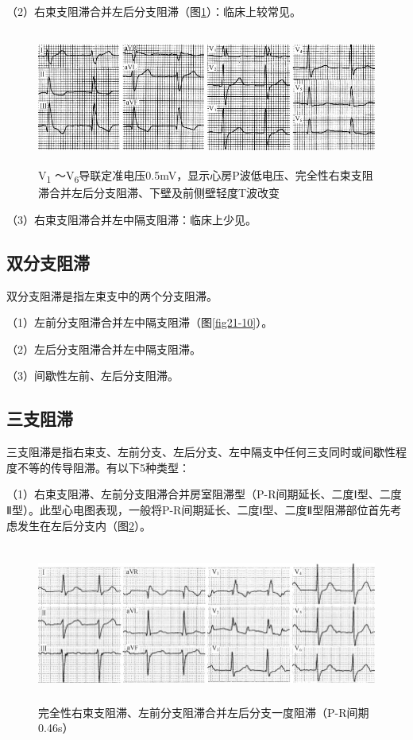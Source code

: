 （2）右束支阻滞合并左后分支阻滞（图\ref{fig21-14}）：临床上较常见。

\begin{figure}[!htbp]
 \centering
 \includegraphics[width=5.58333in,height=1.75in]{./images/Image00362.jpg}
 \captionsetup{justification=centering}
 \caption{V\textsubscript{1} ～V\textsubscript{6}导联定准电压0.5mV，显示心房P波低电压、完全性右束支阻滞合并左后分支阻滞、下壁及前侧壁轻度T波改变}
 \label{fig21-14}
  \end{figure} 


（3）右束支阻滞合并左中隔支阻滞：临床上少见。

\protect\hypertarget{text00028.htmlux5cux23subid352}{}{}

\subsection{双分支阻滞}

双分支阻滞是指左束支中的两个分支阻滞。

（1）左前分支阻滞合并左中隔支阻滞（图\ref{fig21-10}）。

（2）左后分支阻滞合并左中隔支阻滞。

（3）间歇性左前、左后分支阻滞。

\protect\hypertarget{text00028.htmlux5cux23subid353}{}{}

\subsection{三支阻滞}

三支阻滞是指右束支、左前分支、左后分支、左中隔支中任何三支同时或间歇性程度不等的传导阻滞。有以下5种类型：

（1）右束支阻滞、左前分支阻滞合并房室阻滞型（P-R间期延长、二度Ⅰ型、二度Ⅱ型）。此型心电图表现，一般将P-R间期延长、二度Ⅰ型、二度Ⅱ型阻滞部位首先考虑发生在左后分支内（图\ref{fig21-15}）。

\begin{figure}[!htbp]
 \centering
 \includegraphics[width=5.78125in,height=2.05208in]{./images/Image00363.jpg}
 \captionsetup{justification=centering}
 \caption{完全性右束支阻滞、左前分支阻滞合并左后分支一度阻滞（P-R间期0.46s）}
 \label{fig21-15}
  \end{figure} 

